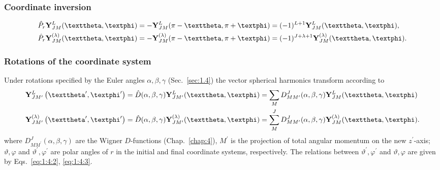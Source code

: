 \subsubsection{Coordinate inversion}
\begin{align}
& \hat{P}_{r} \vect{Y}_{J M}^{L}(\vartheta, \varphi)=-\vect{Y}_{J M}^{L}(\pi-\vartheta, \pi+\varphi)=(-1)^{L+1} \vect{Y}_{J M}^{L}(\vartheta, \varphi),  \notag\\
& \hat{P}_{r} \vect{Y}_{J M}^{(\lambda)}(\vartheta, \varphi)=-\vect{Y}_{J M}^{(\lambda)}(\pi-\vartheta, \pi+\varphi)=(-1)^{J+\lambda+1} \vect{Y}_{J M}^{(\lambda)}(\vartheta, \varphi). \label{eq:7:3:44}
\end{align}
\subsubsection{Rotations of the coordinate system}

Under rotations specified by the Euler angles $\alpha, \beta, \gamma$ (Sec.~\ref{sec:1.4}) the vector spherical harmonics transform according to
\begin{align}
& \vect{Y}_{J M^{\prime}}^{L}\left(\vartheta^{\prime}, \varphi^{\prime}\right)=\hat{D}(\alpha, \beta, \gamma) \vect{Y}_{J M^{\prime}}^{L}(\vartheta, \varphi)=\sum_{M} D_{M M^{\prime}}^{J}(\alpha, \beta, \gamma) \vect{Y}_{J M}^{L}(\vartheta, \varphi)  \notag\\
& \vect{Y}_{J M^{\prime}}^{(\lambda)}\left(\vartheta^{\prime}, \varphi^{\prime}\right)=\hat{D}(\alpha, \beta, \gamma) \vect{Y}_{J M^{\prime}}^{(\lambda)}(\vartheta, \varphi)=\sum_{M}^{J} D_{M M^{\prime}}^{J}(\alpha, \beta, \gamma) \vect{Y}_{J M}^{(\lambda)}(\vartheta, \varphi). \label{eq:7:3:45}
\end{align}
where $D_{M M^{\prime}}^{J}(\alpha, \beta, \gamma)$ are the Wigner $D$-functions (Chap.~\ref{chap:4}), $M^{\prime}$ is the projection of total angular momentum on the new $z^{\prime}$-axis; $\vartheta, \varphi$ and $\vartheta^{\prime}, \varphi^{\prime}$ are polar angles of $r$ in the initial and final coordinate systems, respectively. The relations between $\vartheta^{\prime}, \varphi^{\prime}$ and $\vartheta, \varphi$ are given by Eqs.~\eqref{eq:1:4:2}, \eqref{eq:1:4:3}.


